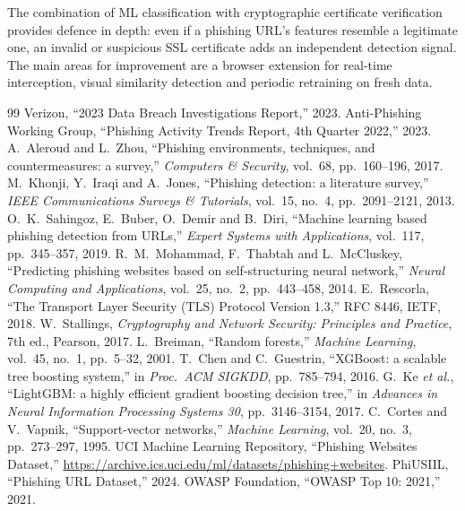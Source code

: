 \documentclass[11pt,a4paper]{article}
\begin{document}
The combination of ML classification with cryptographic certificate verification provides defence in depth: even if a phishing URL's features resemble a legitimate one, an invalid or suspicious SSL certificate adds an independent detection signal. The main areas for improvement are a browser extension for real-time interception, visual similarity detection and periodic retraining on fresh data.

\clearpage
{}
\begin{thebibliography}{99}
 Verizon, ``2023 Data Breach Investigations Report,'' 2023.
 Anti-Phishing Working Group, ``Phishing Activity Trends Report, 4th Quarter 2022,'' 2023.
 A.~Aleroud and L.~Zhou, ``Phishing environments, techniques, and countermeasures: a survey,'' \emph{Computers \& Security}, vol.~68, pp.~160--196, 2017.
 M.~Khonji, Y.~Iraqi and A.~Jones, ``Phishing detection: a literature survey,'' \emph{IEEE Communications Surveys \& Tutorials}, vol.~15, no.~4, pp.~2091--2121, 2013.
 O.~K.~Sahingoz, E.~Buber, O.~Demir and B.~Diri, ``Machine learning based phishing detection from URLs,'' \emph{Expert Systems with Applications}, vol.~117, pp.~345--357, 2019.
 R.~M.~Mohammad, F.~Thabtah and L.~McCluskey, ``Predicting phishing websites based on self-structuring neural network,'' \emph{Neural Computing and Applications}, vol.~25, no.~2, pp.~443--458, 2014.
 E.~Rescorla, ``The Transport Layer Security (TLS) Protocol Version 1.3,'' RFC 8446, IETF, 2018.
 W.~Stallings, \emph{Cryptography and Network Security: Principles and Practice}, 7th ed., Pearson, 2017.
 L.~Breiman, ``Random forests,'' \emph{Machine Learning}, vol.~45, no.~1, pp.~5--32, 2001.
 T.~Chen and C.~Guestrin, ``XGBoost: a scalable tree boosting system,'' in \emph{Proc.\ ACM SIGKDD}, pp.~785--794, 2016.
 G.~Ke \emph{et al.}, ``LightGBM: a highly efficient gradient boosting decision tree,'' in \emph{Advances in Neural Information Processing Systems 30}, pp.~3146--3154, 2017.
 C.~Cortes and V.~Vapnik, ``Support-vector networks,'' \emph{Machine Learning}, vol.~20, no.~3, pp.~273--297, 1995.
 UCI Machine Learning Repository, ``Phishing Websites Dataset,'' \url{https://archive.ics.uci.edu/ml/datasets/phishing+websites}.
 PhiUSIIL, ``Phishing URL Dataset,'' 2024.
 OWASP Foundation, ``OWASP Top 10: 2021,'' 2021.
\end{thebibliography}
\end{document}
